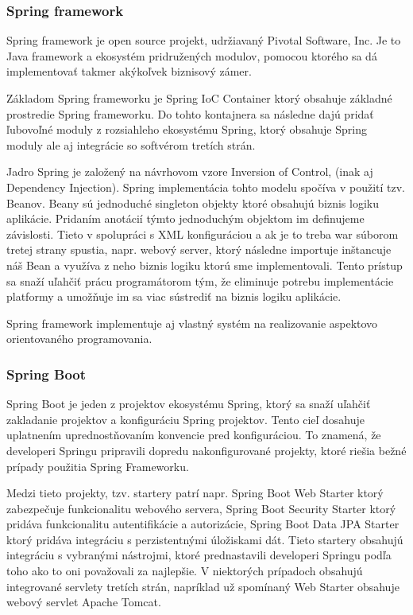 \subsubsection{Spring framework}
Spring framework je open source projekt, udržiavaný  Pivotal Software, Inc. Je to Java framework a ekosystém pridružených modulov, pomocou ktorého sa dá implementovať takmer akýkoľvek biznisový zámer.  

Základom Spring frameworku je Spring IoC Container ktorý obsahuje základné prostredie Spring frameworku. Do tohto kontajnera sa následne dajú pridať ľubovoľné moduly z rozsiahleho ekosystému Spring, ktorý obsahuje Spring moduly ale aj integrácie so softvérom tretích strán.

Jadro Spring je založený na návrhovom vzore Inversion of Control, (inak aj Dependency Injection). Spring implementácia tohto modelu spočíva v použití tzv. Beanov. Beany sú jednoduché singleton objekty ktoré obsahujú biznis logiku aplikácie. Pridaním anotácií týmto jednoduchým objektom im definujeme závislosti. Tieto v spolupráci s XML konfiguráciou a ak je to treba war súborom tretej strany spustia, napr. webový server, ktorý následne importuje inštancuje náš Bean a využíva z neho biznis logiku ktorú sme implementovali. 
Tento prístup sa snaží uľahčiť prácu programátorom tým, že eliminuje potrebu implementácie platformy a umožňuje im sa viac sústrediť na biznis logiku aplikácie.  

Spring framework implementuje aj vlastný systém na realizovanie aspektovo orientovaného programovania.

\subsubsection{Spring Boot}
Spring Boot je jeden z projektov ekosystému Spring, ktorý sa snaží uľahčiť zakladanie projektov a konfiguráciu Spring projektov. Tento cieľ dosahuje uplatnením uprednostňovaním konvencie pred konfiguráciou. To znamená, že developeri Springu pripravili dopredu nakonfigurované projekty, ktoré riešia bežné prípady použitia Spring Frameworku. 

Medzi tieto projekty, tzv. startery patrí napr. Spring Boot Web Starter ktorý zabezpečuje funkcionalitu webového servera, Spring Boot Security Starter ktorý pridáva funkcionalitu autentifikácie a autorizácie, Spring Boot Data JPA Starter ktorý pridáva integráciu s perzistentnými úložiskami dát. Tieto startery obsahujú integráciu s vybranými nástrojmi, ktoré prednastavili developeri Springu podľa toho ako to oni považovali za najlepšie. V niektorých prípadoch obsahujú integrované servlety tretích strán, napríklad už spomínaný Web Starter obsahuje webový servlet Apache Tomcat. 

